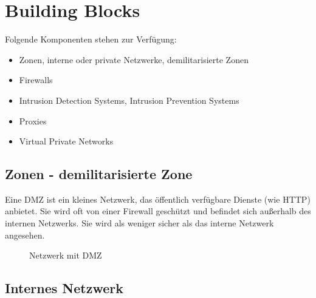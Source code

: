 \section{Building Blocks}%
\label{sec:building_blocks}

Folgende Komponenten stehen zur Verfügung:
\begin{itemize}
  \item Zonen, interne oder private Netzwerke, demilitarisierte Zonen
  \item Firewalls
  \item Intrusion Detection Systems, Intrusion Prevention Systems
  \item Proxies
  \item Virtual Private Networks
\end{itemize}

\subsection{Zonen - demilitarisierte Zone}%
\label{sub:zonen_dmz}

Eine DMZ ist ein kleines Netzwerk, das öffentlich verfügbare Dienste (wie HTTP) anbietet.
Sie wird oft von einer Firewall geschützt und befindet sich außerhalb des internen
Netzwerks.
Sie wird als weniger sicher als das interne Netzwerk angesehen.

\begin{figure}[h]
  \centering
  \caption{Netzwerk mit DMZ}
  \label{fig:dmz}
\end{figure}

\subsection{Internes Netzwerk}%
\label{sub:internes_netzwerk}

